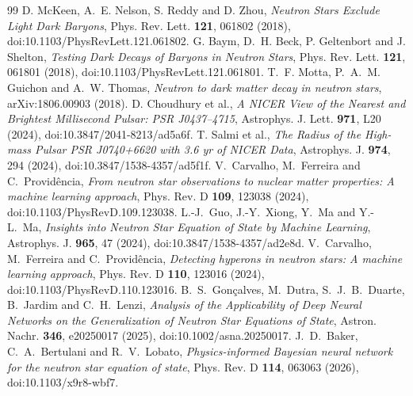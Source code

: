 \documentclass[11pt,a4paper]{article}
\begin{document}
\begin{thebibliography}{99}\small
{} D. McKeen, A.~E. Nelson, S. Reddy and D. Zhou, \emph{Neutron Stars Exclude Light Dark Baryons}, Phys. Rev. Lett. \textbf{121}, 061802 (2018), doi:10.1103/PhysRevLett.121.061802.
 G. Baym, D.~H. Beck, P. Geltenbort and J. Shelton, \emph{Testing Dark Decays of Baryons in Neutron Stars}, Phys. Rev. Lett. \textbf{121}, 061801 (2018), doi:10.1103/PhysRevLett.121.061801.
 T.~F. Motta, P.~A.~M. Guichon and A.~W. Thomas, \emph{Neutron to dark matter decay in neutron stars}, arXiv:1806.00903 (2018).
 D. Choudhury et al., \emph{A NICER View of the Nearest and Brightest Millisecond Pulsar: PSR J0437--4715}, Astrophys. J. Lett. \textbf{971}, L20 (2024), doi:10.3847/2041-8213/ad5a6f.
 T. Salmi et al., \emph{The Radius of the High-mass Pulsar PSR J0740+6620 with 3.6 yr of NICER Data}, Astrophys. J. \textbf{974}, 294 (2024), doi:10.3847/1538-4357/ad5f1f.
 V.~Carvalho, M.~Ferreira and C.~Provid\^encia, \emph{From neutron star observations to nuclear matter properties: A machine learning approach}, Phys. Rev. D \textbf{109}, 123038 (2024), doi:10.1103/PhysRevD.109.123038.
 L.-J.~Guo, J.-Y.~Xiong, Y.~Ma and Y.-L.~Ma, \emph{Insights into Neutron Star Equation of State by Machine Learning}, Astrophys. J. \textbf{965}, 47 (2024), doi:10.3847/1538-4357/ad2e8d.
 V.~Carvalho, M.~Ferreira and C.~Provid\^encia, \emph{Detecting hyperons in neutron stars: A machine learning approach}, Phys. Rev. D \textbf{110}, 123016 (2024), doi:10.1103/PhysRevD.110.123016.
 B.~S.~Gon\c{c}alves, M.~Dutra, S.~J.~B.~Duarte, B.~Jardim and C.~H.~Lenzi, \emph{Analysis of the Applicability of Deep Neural Networks on the Generalization of Neutron Star Equations of State}, Astron. Nachr. \textbf{346}, e20250017 (2025), doi:10.1002/asna.20250017.
 J.~D.~Baker, C.~A.~Bertulani and R.~V.~Lobato, \emph{Physics-informed Bayesian neural network for the neutron star equation of state}, Phys. Rev. D \textbf{114}, 063063 (2026), doi:10.1103/x9r8-wbf7.


\end{thebibliography}
\end{document}
